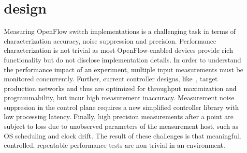 

\section{\oflops design}\label{sec:oflops-design}

Measuring OpenFlow switch implementations is a challenging task in terms of
characterization accuracy, noise suppression and precision.  Performance
characterization is not trivial as most OpenFlow-enabled devices provide rich
functionality but do not disclose implementation details. In order to understand
the performance impact of an experiment, multiple input measurements must be
monitored concurrently. Further, current controller designs,
like~\cite{Gude08,SNAC}, target production networks and thus are optimized for
throughput maximization and programmability, but incur high measurement
inaccuracy. Measurement noise suppresion in the control plane requires 
a new simplified \of controller library with low processing
latency. Finally, high precision measurements after a point are subject to loss
due to unobserved parameters of the measurement host, such as OS scheduling and
clock drift. The result of these challenges is that meaningful, 
controlled, repeatable performance tests are non-trivial in an \of
environment.

